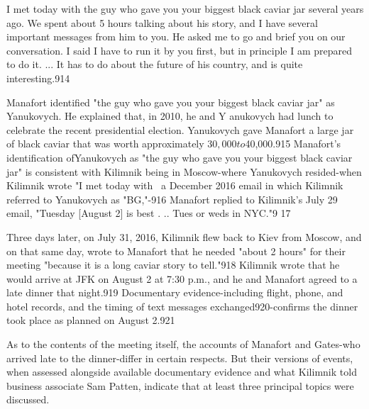 I met today with the guy who gave you your biggest black caviar jar several years ago. We spent about 5  hours talking about his story,  and I  have several important messages from him to you. He asked me to go and brief you on our conversation. I said I  have to run it by you first, but in principle I am prepared to do it. ... It has to do about the future of his country, and is quite interesting.914

Manafort identified "the guy who gave you your biggest black caviar jar" as Yanukovych. He explained that, in 2010, he and Y anukovych had lunch to celebrate the recent presidential election. Yanukovych gave Manafort a  large jar of black caviar that was worth approximately $30,000 to $40,000.915 Manafort's identification ofYanukovych as "the guy who gave you your biggest black caviar jar" is consistent with Kilimnik being in Moscow-where Yanukovych resided-when Kilimnik wrote "I met today with~ a December 2016 email in which Kilimnik referred to Yanukovych as "BG,"-916 Manafort replied to Kilimnik's July 29 email, "Tuesday [August 2] is best . ..  Tues or weds in NYC."9 17

Three days later, on July 31, 2016, Kilimnik flew back to Kiev from Moscow, and on that same day, wrote to Manafort that he needed "about 2 hours" for their meeting "because it is a long caviar story to tell."918 Kilimnik wrote that he would arrive at JFK on August 2 at 7:30 p.m., and he and Manafort agreed to a  late dinner that night.919 Documentary evidence-including flight, phone, and hotel records, and the timing of text messages exchanged920-confirms the dinner took place as planned on August 2.921

As to the contents of the meeting itself, the accounts of Manafort and Gates-who arrived late to the dinner-differ in certain respects. But their versions of events, when assessed alongside available documentary evidence and what Kilimnik told business associate Sam Patten, indicate that at least three principal topics were discussed.

